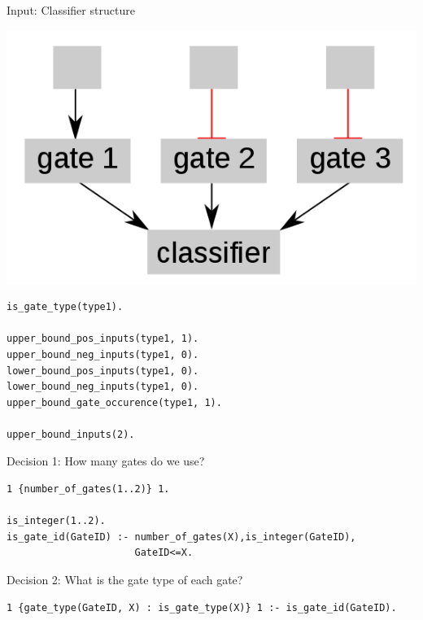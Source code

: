 \documentclass[10pt,dvipsnames]{beamer}
\begin{document}
\begin{frame}[fragile]{Input: Classifier structure}
\begin{center}
\includegraphics[scale=0.25]{classifier.png}
\end{center}
\vspace{0.3cm}

\begin{verbatim}
is_gate_type(type1).

upper_bound_pos_inputs(type1, 1). 
upper_bound_neg_inputs(type1, 0). 
lower_bound_pos_inputs(type1, 0). 
lower_bound_neg_inputs(type1, 0). 
upper_bound_gate_occurence(type1, 1). 
 
upper_bound_inputs(2).
\end{verbatim}

\end{frame}


\begin{frame}[fragile]{Decision 1: How many gates do we use?}
\small
\begin{verbatim}
1 {number_of_gates(1..2)} 1.

is_integer(1..2).
is_gate_id(GateID) :- number_of_gates(X),is_integer(GateID), 
                      GateID<=X.
\end{verbatim}
\end{frame}


\begin{frame}[fragile]{Decision 2: What is the gate type of each gate?}
\small
\begin{verbatim}
1 {gate_type(GateID, X) : is_gate_type(X)} 1 :- is_gate_id(GateID).
\end{verbatim}
\end{frame}
\end{document}
